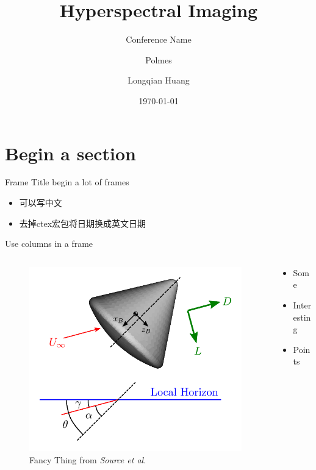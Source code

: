 \documentclass{cubeamer}
\title{Hyperspectral Imaging}
\subtitle{Conference Name}
\author[Longqian Huang]{Polmes \and Longqian Huang} %
\date{\today} %
\institute[Zhejiang University]{Optical Science and Engineering}
\begin{document}
\maketitle

\cutoc

\section{Begin a section}

\begin{frame}{Frame Title}
	begin a lot of frames
	
    \begin{itemize}
        \item 可以写中文
        \item 去掉ctex宏包将日期换成英文日期
    \end{itemize}
\end{frame}

\begin{frame}{Use columns in a frame}
    \begin{columns}
        \begin{column}{0.6\textwidth}
            \begin{figure}
                \centering
                \includegraphics[height = 0.7\textheight]{figures/example.pdf}
                \caption{Fancy Thing from \textit{Source et al.}}
            \end{figure}
        \end{column}
        \begin{column}{0.4\textwidth}
            \begin{itemize}
                \item Some
                \item Interesting
                \item Points
            \end{itemize}
        \end{column}
    \end{columns}
\end{frame}
\end{document}

